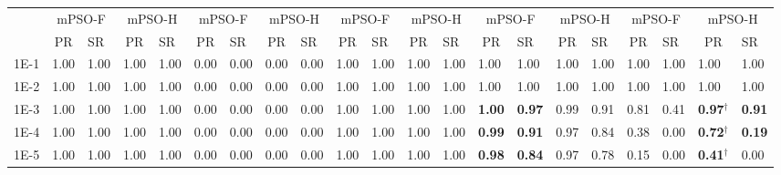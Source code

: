 \begin{table*}[h]
{\begin{tabular}{|p{4.8mm}|p{4.4mm}|p{4.4mm}|p{4.4mm}|p{4.4mm}|p{4.4mm}|p{4.4mm}|p{4.4mm}|p{4.4mm}|p{4.4mm}|p{4.4mm}|p{4.4mm}|p{4.4mm}|p{4.4mm}|p{4.4mm}|p{4.4mm}|p{4.4mm}|p{4.4mm}|p{4.4mm}|p{4.4mm}|p{4.4mm}|}
    \cline{2-21}
    & \multicolumn{2}{c|}{mPSO-F} & \multicolumn{2}{c|}{mPSO-H} & \multicolumn{2}{c|}{mPSO-F} & \multicolumn{2}{c|}{mPSO-H} & \multicolumn{2}{c|}{mPSO-F} & \multicolumn{2}{c|}{mPSO-H} & \multicolumn{2}{c|}{mPSO-F} & \multicolumn{2}{c|}{mPSO-H} & \multicolumn{2}{c|}{mPSO-F} & \multicolumn{2}{c|}{mPSO-H} \\

    \cline{2-21}
     & \multicolumn{1}{c|}{PR} & SR & \multicolumn{1}{c|}{PR} & SR & \multicolumn{1}{c|}{PR} & SR & \multicolumn{1}{c|}{PR} & SR & \multicolumn{1}{c|}{PR} & SR & \multicolumn{1}{c|}{PR} & SR & \multicolumn{1}{c|}{PR} & SR & \multicolumn{1}{c|}{PR} & SR & \multicolumn{1}{c|}{PR} & SR & \multicolumn{1}{c|}{PR} & SR \\
    \hline
    1E-1 & 1.00 & 1.00 & 1.00 & 1.00 & 0.00 & 0.00 & 0.00 & 0.00 & 1.00 & 1.00 & 1.00 & 1.00 & 1.00 & 1.00 & 1.00 & 1.00 & 1.00 & 1.00 & 1.00 & 1.00 \\
    1E-2 & 1.00 & 1.00 & 1.00 & 1.00 & 0.00 & 0.00 & 0.00 & 0.00 & 1.00 & 1.00 & 1.00 & 1.00 & 1.00 & 1.00 & 1.00 & 1.00 & 1.00 & 1.00 & 1.00 & 1.00 \\
    1E-3 & 1.00 & 1.00 & 1.00 & 1.00 & 0.00 & 0.00 & 0.00 & 0.00 & 1.00 & 1.00 & 1.00 & 1.00 & \textcolor{customred}{\textbf{1.00}} & \textcolor{customred}{\textbf{0.97}} & 0.99 & 0.91 & 0.81 & 0.41 & \textcolor{customblue}{\textbf{0.97$^\dagger$}} & \textcolor{customblue}{\textbf{0.91}} \\
    1E-4 & 1.00 & 1.00 & 1.00 & 1.00 & 0.00 & 0.00 & 0.00 & 0.00 & 1.00 & 1.00 & 1.00 & 1.00 & \textcolor{customred}{\textbf{0.99}} & \textcolor{customred}{\textbf{0.91}} & 0.97 & 0.84 & 0.38 & 0.00 & \textcolor{customblue}{\textbf{0.72$^\dagger$}} & \textcolor{customblue}{\textbf{0.19}} \\
    1E-5 & 1.00 & 1.00 & 1.00 & 1.00 & 0.00 & 0.00 & 0.00 & 0.00 & 1.00 & 1.00 & 1.00 & 1.00 & \textcolor{customred}{\textbf{0.98}} & \textcolor{customred}{\textbf{0.84}} & 0.97 & 0.78 & 0.15 & 0.00 & \textcolor{customblue}{\textbf{0.41$^\dagger$}} & 0.00 \\
    \hline
  \end{tabular}
  }
  \noindent{}
\end{table*}
